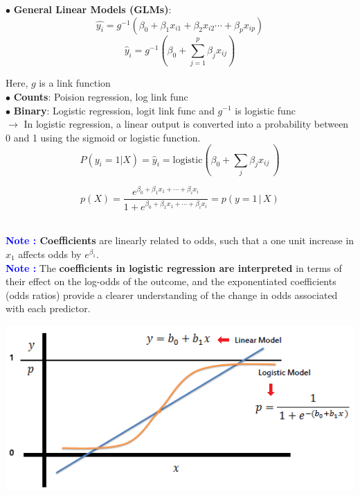 \documentclass[letterpaper, 10.5pt,landscape]{article}
\begin{document}
\begin{multicols*}{3}
\vspace{3pt}
$\bullet$ \textbf{General Linear Models (GLMs)}: 
\vspace{-3pt}
\[\hat{y_{i}} = g^{-1}\left(\beta_{0} + \beta_{1} x_{i1} + \beta_{2} x_{i2} \cdots + \beta_{p} x_{ip} \right) \]
\vspace{-5pt}
\[\boxed{\hat{y}_{i} = g^{-1}\left(\beta_{0} + \sum_{j=1}^{p} \beta_{j} x_{ij}  \right)}\]

Here, $g$ is a link function 
\\

$\bullet$ \textbf{Counts}: Poision regression, log link func \\
$\bullet$ \textbf{Binary}: Logistic regression, logit link  func and $g^{-1}$ is logistic func \\


$\rightarrow$ In logistic regression, a linear output is converted into a probability between 0 and 1 using the sigmoid or logistic function. 
\vspace{-4pt}
\[\boxed{P(y_{i}=1|X) = \hat{y}_{i} = \text{logistic} \left(\beta_{0} + \sum_{j} \beta_{j} x_{ij} \ \right)} \]

\vspace{-3pt}
\[\boxed{ p(X) = \frac{e^{\beta_{0} + \beta_{1}x_{1} + \cdots + \beta_{i} x_{i}}}{1 + e^{\beta_{0} + \beta_{1}x_{1} + \cdots + \beta_{i} x_{i}}}  = p(y = 1 \, | \, X)}\] \




\textbf{\textcolor{blue}{Note :} Coefficients} are linearly related to odds, such that a one unit increase in $x_{1}$ affects odds by $e^{\beta_{1}}$. \\

\textbf{\textcolor{blue}{Note :}} The \textbf{coefficients in logistic regression are interpreted} in terms of their effect on the log-odds of the outcome, and the exponentiated coefficients (odds ratios) provide a clearer understanding of the change in odds associated with each predictor.



\vspace{-5pt}
\begin{center}
    \begin{minipage}{0.86\linewidth}
    \includegraphics[width=\textwidth]{figures/logistic_function_regression.PNG}
    \end{minipage}
\end{center}


\end{multicols*}
\end{document}
